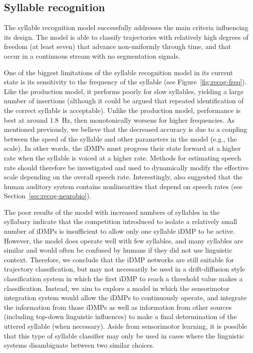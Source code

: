 \subsection{Syllable recognition}

The syllable recognition model
successfully addresses the main criteria
influencing its design.
The model is able to classify trajectories
with relatively high degrees of freedom
(at least seven)
that advance non-uniformly through time,
and that occur in a continuous stream
with no segmentation signals.

One of the biggest limitations
of the syllable recognition model
in its current state
is its sensitivity to the
frequency of the syllable
(see Figure~\ref{fig:recog-freq}).
Like the production model,
it performs poorly for
slow syllables,
yielding a large number of insertions
(although it could be argued that
repeated identification of the correct
syllable is acceptable).
Unlike the production model,
performance is best at around 1.8~Hz,
then monotonically worsens
for higher frequencies.
As mentioned previously,
we believe that the decreased accuracy
is due to a coupling between
the speed of the syllable
and other parameters in the model
(e.g., the scale).
In other words, the iDMPs
must progress their state forward
at a higher rate when
the syllable is voiced at a higher rate.
Methods for estimating speech rate
should therefore be investigated
and used to dynamically modify
the effective scale
depending on the overall speech rate.
Interestingly, \citet{pasley2012}
also suggested that the human auditory system
contains nonlinearities that depend
on speech rates
(see Section~\ref{sec:recog-neurobio}).

The poor results of the model
with increased numbers
of syllables in the syllabary
indicate that the competition
introduced to isolate a relatively small
number of iDMPs is insufficient
to allow only one syllable iDMP to be active.
However, the model does operate well
with few syllables,
and many syllables are similar
and would often be confused by humans
if they did not use linguistic context.
Therefore, we conclude that
the iDMP networks are still suitable
for trajectory classification,
but may not necessarily be used in a
drift-diffusion style classification system
in which the first iDMP to reach
a threshold value makes a classification.
Instead, we aim to explore a model in which
the sensorimotor integration system
would allow the iDMPs to continuously operate,
and integrate the information from those iDMPs
as well as information from other sources
(including top-down linguistic influences)
to make a final determination
of the uttered syllable
(when necessary).
Aside from sensorimotor learning,
it is possible that
this type of syllable classifier
may only be used in cases where
the linguistic systems
disambiguate between two similar choices.

